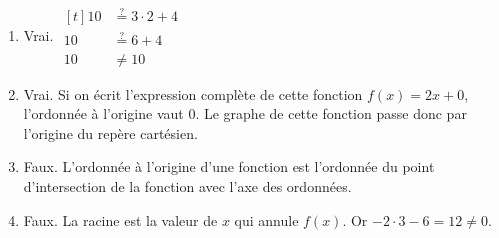 %
%
    \begin{enumerate}
        \item Vrai.
              $\begin{aligned}[t]
                      10 & \stackrel{?}{=} 3\cdot 2 + 4 \\
                      10 & \stackrel{?}{=} 6 + 4        \\
                      10 & \ne 10
                  \end{aligned}$
        \item Vrai. Si on écrit l'expression complète de cette fonction $f(x) = 2x + 0$, l'ordonnée à l'origine vaut $0$. Le graphe de cette fonction passe donc par l'origine du repère cartésien.
        \item Faux. L'ordonnée à l'origine d'une fonction est l'ordonnée du point d'intersection de la fonction avec l'axe des ordonnées.
        \item Faux. La racine est la valeur de $x$ qui annule $f(x)$. Or $-2\cdot 3 - 6 = 12 \ne 0$.
    \end{enumerate}
